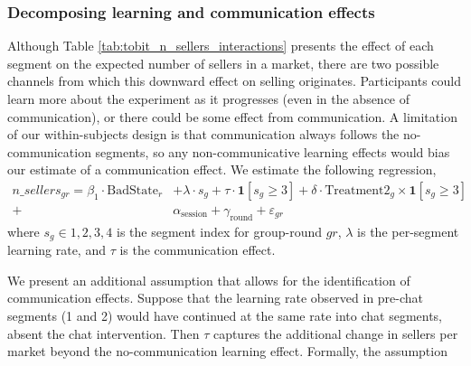 \documentclass[11pt]{article}
\begin{document}
\subsubsection{Decomposing learning and communication effects}
\label{sub:did_learning_communication}

Although Table \ref{tab:tobit_n_sellers_interactions} presents the effect of each segment on the expected number of sellers in a market, there are two possible channels from which this downward effect on selling originates. Participants could learn more about the experiment as it progresses (even in the absence of communication), or there could be some effect from communication. A limitation of our within-subjects design is that communication always follows the no-communication segments, so any non-communicative learning effects would bias our estimate of a communication effect. We estimate the following regression,
\begin{equation}
  \begin{split}
n\_sellers_{gr} = \beta_1 \cdot \text{BadState}_r &+ \lambda \cdot s_g + \tau \cdot \mathbf{1}[s_g \geq 3] + \delta \cdot \text{Treatment2}_g \times \mathbf{1}[s_g \geq 3] \\+
  &\alpha_{\text{session}} + \gamma_{\text{round}} + \varepsilon_{gr}
    \end{split}
  \label{eq:comms}
\end{equation}
where $s_g \in {1, 2, 3, 4}$ is the segment index for group-round $gr$, $\lambda$ is the per-segment learning rate, and $\tau$ is the communication effect.

We present an additional assumption that allows for the identification of communication effects. Suppose that the learning rate observed in pre-chat segments (1 and 2) would have continued at the same rate into chat segments, absent the chat intervention. Then $\tau$ captures the additional change in sellers per market beyond the no-communication learning effect. Formally, the assumption
\end{document}
